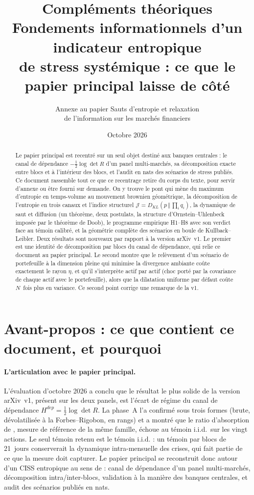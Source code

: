 \documentclass[11pt]{article}
\title{Compléments théoriques\\[4pt]
\large Fondements informationnels d'un indicateur entropique\\de stress systémique : ce que le papier principal laisse de côté}
\author{Annexe au papier \og Sauts d'entropie et relaxation\\de l'information sur les marchés financiers \fg{}}
\date{Octobre 2026}
\theoremstyle{definition}
\theoremstyle{remark}
\newcommand{\JJ}{\mathcal{J}}
\newcommand{\KL}[2]{D_{KL}\!\left(#1\,\Vert\,#2\right)}
\begin{document}
\maketitle

\begin{abstract}
\noindent Le papier principal est recentré sur un seul objet destiné aux
banques centrales : le canal de dépendance $-\tfrac12\log\det R$ d'un panel
multi-marchés, sa décomposition exacte entre blocs et à l'intérieur des blocs,
et l'audit en nats des scénarios de stress publiés. Ce document rassemble tout
ce que ce recentrage retire du corps du texte, pour servir d'annexe ou être
fourni sur demande. On y trouve le pont qui mène du maximum d'entropie en
temps-volume au mouvement brownien géométrique, la décomposition de l'entropie
en trois canaux et l'indice structurel $\JJ=\KL{p}{\prod_i q_i}$, la dynamique
de saut et diffusion (un théorème, deux postulats, la structure
d'Ornstein--Uhlenbeck imposée par le théorème de Doob), le programme empirique
H1--H8 avec son verdict face au témoin calibré, et la géométrie complète des
scénarios en boule de Kullback--Leibler. Deux résultats sont nouveaux par
rapport à la version arXiv~v1. Le premier est une identité de décomposition par
blocs du canal de dépendance, qui relie ce document au papier principal. Le
second montre que le relèvement d'un scénario de portefeuille à la dimension
pleine qui minimise la divergence ambiante coûte exactement le rayon $\eta$, et
qu'il s'interprète actif par actif (choc porté par la covariance de chaque actif
avec le portefeuille), alors que la dilatation uniforme par défaut coûte $N$~fois
plus en variance. Ce second point corrige une remarque de la v1.
\end{abstract}

\tableofcontents

\section*{Avant-propos : ce que contient ce document, et pourquoi}

\paragraph{L'articulation avec le papier principal.} L'évaluation d'octobre 2026
a conclu que le résultat le plus solide de la version arXiv~v1, présent sur
les deux panels, est l'écart de régime du canal de dépendance
$H^{dep}=\tfrac12\log\det R$. La phase~A l'a confirmé sous trois formes (brute,
dévolatilisée à la Forbes--Rigobon, en rangs) et a montré que le ratio
d'absorption de \citet{kritzman2011}, mesure de référence de la même famille,
échoue au témoin i.i.d.\ sur les vingt actions. Le seul témoin retenu est le
témoin i.i.d. : un témoin par blocs de 21~jours conserverait la dynamique
intra-mensuelle des crises, qui fait partie de ce que la mesure doit
capturer. Le papier principal se reconstruit donc autour d'un
\og CISS entropique \fg{} au sens de \citet{hollo2012} : canal de dépendance d'un
panel multi-marchés, décomposition intra/inter-blocs, validation à la manière
des banques centrales, et audit des scénarios publiés en nats.
\end{document}
